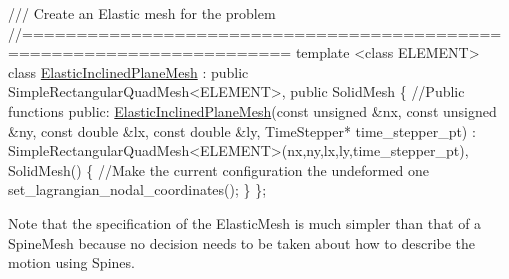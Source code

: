 \begin{DoxyCodeInclude}
\textcolor{comment}{/// Create an Elastic mesh for the problem}
\textcolor{comment}{//======================================================================}
\textcolor{keyword}{template} <\textcolor{keyword}{class} ELEMENT>
\textcolor{keyword}{class }\hyperlink{classElasticInclinedPlaneMesh}{ElasticInclinedPlaneMesh} : 
 \textcolor{keyword}{public} SimpleRectangularQuadMesh<ELEMENT>,
 \textcolor{keyword}{public} SolidMesh
\{
 \textcolor{comment}{//Public functions}
 \textcolor{keyword}{public}:
 \hyperlink{classElasticInclinedPlaneMesh_a61ba6d852505dd1353e791223fdfce04}{ElasticInclinedPlaneMesh}(\textcolor{keyword}{const} \textcolor{keywordtype}{unsigned} &nx, \textcolor{keyword}{const} \textcolor{keywordtype}{unsigned} &ny,
                          \textcolor{keyword}{const} \textcolor{keywordtype}{double} &lx, \textcolor{keyword}{const} \textcolor{keywordtype}{double} &ly,
                          TimeStepper* time\_stepper\_pt) :
  SimpleRectangularQuadMesh<ELEMENT>(nx,ny,lx,ly,time\_stepper\_pt), SolidMesh()
  \{
   \textcolor{comment}{//Make the current configuration the undeformed one}
   set\_lagrangian\_nodal\_coordinates();
  \}
\};

\end{DoxyCodeInclude}
 Note that the specification of the Elastic\+Mesh is much simpler than that of a Spine\+Mesh because no decision needs to be taken about how to describe the motion using Spines.



 

